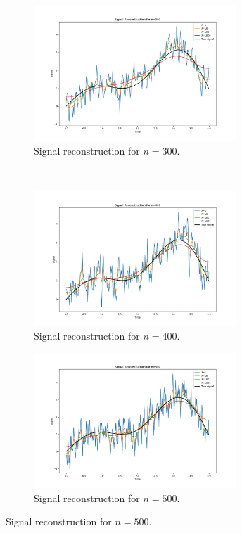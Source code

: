 \documentclass{article}
\begin{document}
\begin{figure}[t!]
    \begin{subfigure}[t]{0.5\textwidth}
        \centering
        \includegraphics[height=2.0in]{signalplot_300.png}
        \caption{Signal reconstruction for $n=300$.}
        \label{fig:signal300}
    \end{subfigure}%
    ~ %
    \begin{subfigure}[t]{0.5\textwidth}
        \centering
        \includegraphics[height=2.0in]{signalplot_400.png}
        \caption{Signal reconstruction for $n=400$.}
        \label{fig:signal400}
    \end{subfigure}
    
    \begin{subfigure}[b]{0.5\textwidth}
        \centering
        \includegraphics[height=2.0in]{signalplot_500.png}
        \caption{Signal reconstruction for $n=500$.}
        \label{fig:signal500}
    \end{subfigure}
    

\end{figure}
\end{document}
